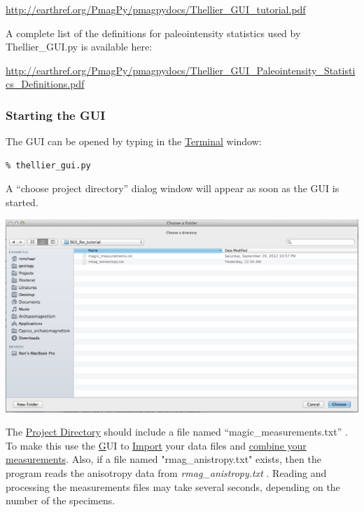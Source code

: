 \documentclass[11pt]{book}
\begin{document}
{{ \url{http://earthref.org/PmagPy/pmagpydocs/Thellier_GUI_tutorial.pdf}
 
\noindent  A complete list of the definitions for paleointensity statistics used by Thellier\_GUI.py is available here:
 
  \url{http://earthref.org/PmagPy/pmagpydocs/Thellier_GUI_Paleointensity_Statistics_Definitions.pdf}


\subsubsection{Starting the GUI}
The GUI can be opened by typing in the  \href{#command_line}{Terminal}  window:

\begin{verbatim}
% thellier_gui.py
\end{verbatim}
A ``choose project directory'' dialog window will appear as soon as the GUI is started.

	\includegraphics[width=15cm]{EPSFiles/Screenshot_choose_directory.eps}
	

 The \href{#Project_Directory}{Project Directory} should include a file named ``magic\_measurements.txt'' .  To make this use the \href{#MagIC.py} GUI to  \href{#ImportMenu}{Import} your data files and \href{#Combining_measurement_files}{combine your measurements}.  Also, if a file named "rmag\_anistropy.txt" exists, then the program reads the anisotropy data from {\it rmag\_anistropy.txt }. Reading and processing the measurements files may take several seconds, depending on the number of the specimens.


}}
\end{document}
